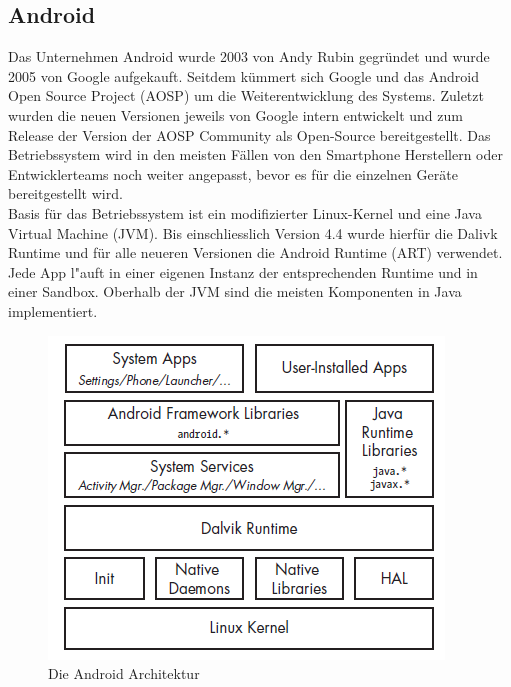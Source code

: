 \subsection{Android}
	Das Unternehmen Android wurde 2003 von Andy Rubin gegründet und wurde 2005 von Google aufgekauft. Seitdem kümmert sich Google und das Android Open Source Project (AOSP) um die Weiterentwicklung des Systems. Zuletzt wurden die neuen Versionen jeweils von Google intern entwickelt und zum Release der Version der AOSP Community als Open-Source bereitgestellt. Das Betriebssystem wird in den meisten Fällen von den Smartphone Herstellern oder Entwicklerteams noch weiter angepasst, bevor es für die einzelnen Geräte bereitgestellt wird.\\
	
	Basis für das Betriebssystem ist ein modifizierter Linux-Kernel und eine Java Virtual Machine (JVM)\cite{ArtDalvik}. Bis einschliesslich Version 4.4 wurde hierfür die Dalivk Runtime und für alle neueren Versionen die Android Runtime (ART) verwendet. Jede App l"auft in einer eigenen Instanz der entsprechenden Runtime und in einer Sandbox.\newline
	Oberhalb der JVM sind die meisten Komponenten in Java implementiert.\\
	
	\begin{figure}[h]
		\centering
		\includegraphics[width=0.7\linewidth]{android_pages/graphics/architektur_android_.png}
		\caption{Die Android Architektur \protect\cite[S. 2]{Elenkov2014} }
		\label{fig:architektur_android}
	\end{figure}
	

